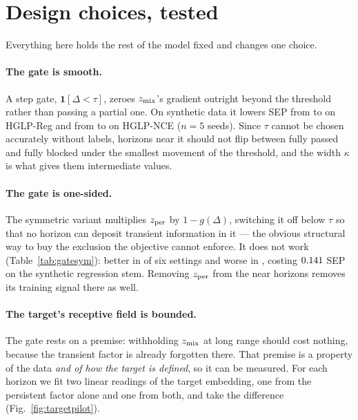 \appendix

\section{Design choices, tested}
\label{app:design}

Everything here holds the rest of the model fixed and changes one choice.

\paragraph{The gate is smooth.}
A step gate, $\mathbf{1}[\Delta<\tau]$, zeroes $z_{\mathrm{mix}}$'s gradient outright beyond the threshold rather than passing a partial one. On synthetic data it lowers SEP from \numSoftReg{} to \numHardReg{} on HGLP-Reg and from \numSoftNCE{} to \numHardNCE{} on HGLP-NCE ($n=5$ seeds). Since $\tau$ cannot be chosen accurately without labels, horizons near it should not flip between fully passed and fully blocked under the smallest movement of the threshold, and the width $\kappa$ is what gives them intermediate values.

\paragraph{The gate is one-sided.}
The symmetric variant multiplies $z_{\mathrm{per}}$ by $1-g(\Delta)$, switching it off below $\tau$ so that no horizon can deposit transient information in it --- the obvious structural way to buy the exclusion the objective cannot enforce. It does not work (Table~\ref{tab:gatesym}): better in \numSymBetter{} of six settings and worse in \numSymWorse, costing $0.141$ SEP on the synthetic regression stem. Removing $z_{\mathrm{per}}$ from the near horizons removes its training signal there as well.



\paragraph{The target's receptive field is bounded.}
The gate rests on a premise: withholding $z_{\mathrm{mix}}$ at long range should cost nothing, because the transient factor is already forgotten there. That premise is a property of the data \emph{and of how the target is defined}, so it can be measured. For each horizon we fit two linear readings of the target embedding, one from the persistent factor alone and one from both, and take the difference (Fig.~\ref{fig:targetpilot}).

